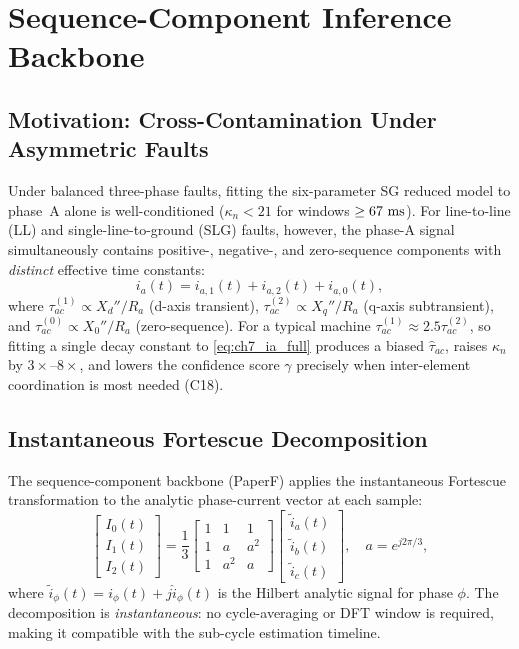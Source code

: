 \section{Sequence-Component Inference Backbone}
\label{sec:ch7_seq}

\subsection{Motivation: Cross-Contamination Under Asymmetric Faults}

Under balanced three-phase faults, fitting the six-parameter SG reduced
model to phase~A alone is well-conditioned ($\kappa_n < 21$ for
windows $\geq 67\,\,\mathrm{ms}$).  For line-to-line (LL) and single-line-to-ground
(SLG) faults, however, the phase-A signal simultaneously contains
positive-, negative-, and zero-sequence components with \emph{distinct}
effective time constants:
\begin{equation}
  i_a(t) = i_{a,1}(t) + i_{a,2}(t) + i_{a,0}(t),
  \label{eq:ch7_ia_full}
\end{equation}
where $\tau_{ac}^{(1)} \propto X_d''/R_a$ (d-axis transient),
$\tau_{ac}^{(2)} \propto X_q''/R_a$ (q-axis subtransient), and
$\tau_{ac}^{(0)} \propto X_0''/R_a$ (zero-sequence).  For a typical
machine $\tau_{ac}^{(1)} \approx 2.5 \tau_{ac}^{(2)}$, so fitting a
single decay constant to \eqref{eq:ch7_ia_full} produces a biased
$\hat\tau_{ac}$, raises $\kappa_n$ by $3\times$--$8\times$, and lowers
the confidence score $\gamma$ precisely when inter-element coordination
is most needed (C18).

\subsection{Instantaneous Fortescue Decomposition}

The sequence-component backbone (PaperF) applies the instantaneous
Fortescue transformation to the analytic phase-current vector at each
sample:
\begin{equation}
  \begin{bmatrix}I_0(t)\\I_1(t)\\I_2(t)\end{bmatrix}
  = \frac{1}{3}
    \begin{bmatrix}1&1&1\\1&a&a^2\\1&a^2&a\end{bmatrix}
    \begin{bmatrix}\tilde{i}_a(t)\\\tilde{i}_b(t)\\\tilde{i}_c(t)\end{bmatrix},
  \quad a = e^{j2\pi/3},
  \label{eq:ch7_fortescue}
\end{equation}
where $\tilde{i}_\phi(t) = i_\phi(t) + j\hat{i}_\phi(t)$ is the Hilbert
analytic signal for phase $\phi$.  The decomposition is
\emph{instantaneous}: no cycle-averaging or DFT window is required, making
it compatible with the sub-cycle estimation timeline.

